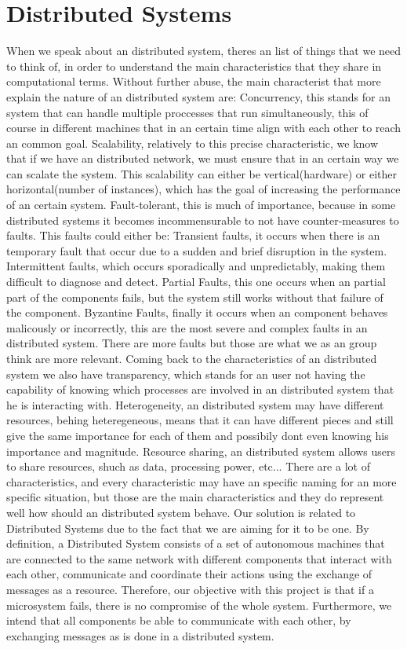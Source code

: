 \section{Distributed Systems}

\quad{} 
 When we speak about an distributed system, theres an list of things that we need to think of, in order to understand the main characteristics that they share in computational terms. Without further abuse, the main characterist that more explain the nature of an distributed system are:
  Concurrency, this stands for an system that can handle multiple proccesses that run simultaneously, this of course in different machines that in an certain time align with each other to reach an common goal.
  Scalability, relatively to this precise characteristic, we know that if we have an distributed network, we must ensure that in an certain way we can scalate the system. This scalability can either be vertical(hardware) or either horizontal(number of instances), which has the goal of increasing the performance of an certain system.
  Fault-tolerant, this is much of importance, because in some distributed systems it becomes incommensurable to not have counter-measures to faults. This faults could either be:
  Transient faults, it occurs when there is an temporary fault that occur due to a sudden and brief disruption in the system.
  Intermittent faults, which occurs sporadically and unpredictably, making them difficult to diagnose and detect.
  Partial Faults, this one occurs when an partial part of the components fails, but the system still works without that failure of the component.
  Byzantine Faults, finally it occurs when an component behaves malicously or incorrectly, this are the most severe and complex faults in an distributed system.
  There are more faults but those are what we as an group think are more relevant.
  Coming back to the characteristics of an distributed system we also have transparency, which stands for an user not having the capability of knowing which processes are involved in an distributed system that he is interacting with.
  Heterogeneity, an distributed system may have different resources, behing heteregeneous, means that it can have different pieces and still give the same importance for each of them and possibily dont even knowing his importance and magnitude.
  Resource sharing, an distributed system allows users to share resources, shuch as data, processing power, etc...
  There are a lot of characteristics, and every characteristic may have an specific naming for an more specific situation, but those are the main characteristics and they do represent well how should an distributed system behave.
\quad Our solution is related to Distributed Systems due to the fact that we are aiming for it to be one. By definition, a Distributed System consists of a set of autonomous machines that are connected to the same network with different components that interact with each other, communicate and coordinate their actions using the exchange of messages as a resource.
  Therefore, our objective with this project is that if a microsystem fails, there is no compromise of the whole system. Furthermore, we intend that all components be able to communicate with each other, by exchanging messages as is done in a distributed system.